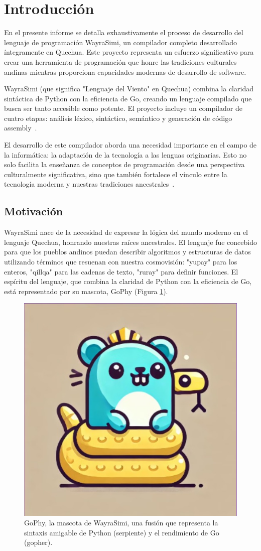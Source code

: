 \documentclass[conference]{IEEEtran}
\begin{document}
\section{Introducción}

En el presente informe se detalla exhaustivamente el proceso de desarrollo del lenguaje de programación WayraSimi, un compilador completo desarrollado íntegramente en Quechua. Este proyecto representa un esfuerzo significativo para crear una herramienta de programación que honre las tradiciones culturales andinas mientras proporciona capacidades modernas de desarrollo de software.

WayraSimi (que significa "Lenguaje del Viento" en Quechua) combina la claridad sintáctica de Python con la eficiencia de Go, creando un lenguaje compilado que busca ser tanto accesible como potente. El proyecto incluye un compilador de cuatro etapas: análisis léxico, sintáctico, semántico y generación de código assembly~\cite{b1}.

El desarrollo de este compilador aborda una necesidad importante en el campo de la informática: la adaptación de la tecnología a las lenguas originarias. Esto no solo facilita la enseñanza de conceptos de programación desde una perspectiva culturalmente significativa, sino que también fortalece el vínculo entre la tecnología moderna y nuestras tradiciones ancestrales~\cite{b3}.

\subsection{Motivación}

WayraSimi nace de la necesidad de expresar la lógica del mundo moderno en el lenguaje Quechua, honrando nuestras raíces ancestrales. El lenguaje fue concebido para que los pueblos andinos puedan describir algoritmos y estructuras de datos utilizando términos que resuenan con nuestra cosmovisión: "yupay" para los enteros, "qillqa" para las cadenas de texto, "ruray" para definir funciones. El espíritu del lenguaje, que combina la claridad de Python con la eficiencia de Go, está representado por su mascota, GoPhy (Figura \ref{fig:gophy}).

\begin{figure}[htbp]
\centering
\includegraphics[width=0.6\linewidth]{gophy.jpg}
\caption{GoPhy, la mascota de WayraSimi, una fusión que representa la sintaxis amigable de Python (serpiente) y el rendimiento de Go (gopher).}
\label{fig:gophy}
\end{figure}
\end{document}
